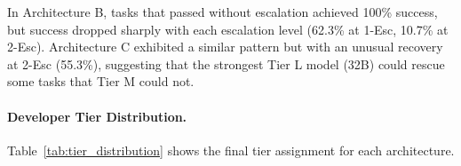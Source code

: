 \begin{table}[ht]
    \centering
    \caption{Escalation Analysis by Architecture.}
    \label{tab:escalation_analysis}
    \footnotesize
\end{table}

In Architecture B, tasks that passed without escalation achieved 100\% success, but success dropped sharply with each escalation level (62.3\% at 1-Esc, 10.7\% at 2-Esc). Architecture C exhibited a similar pattern but with an unusual recovery at 2-Esc (55.3\%), suggesting that the strongest Tier L model (32B) could rescue some tasks that Tier M could not.

\paragraph{Developer Tier Distribution.}
Table~\ref{tab:tier_distribution} shows the final tier assignment for each architecture.

\begin{table}[ht]
    \centering
    \caption{Developer Tier Distribution (Final Assignment).}
    \label{tab:tier_distribution}
    \footnotesize
\end{table}

